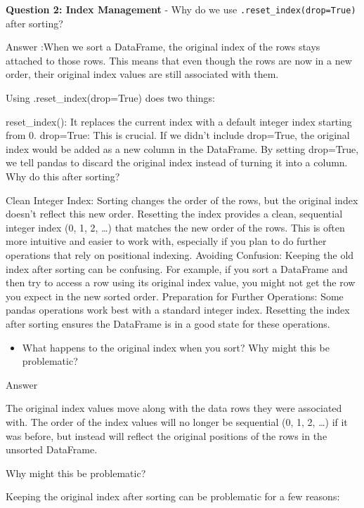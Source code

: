 \documentclass[
  letterpaper,
  DIV=11,
  numbers=noendperiod]{scrartcl}
\providecommand{\tightlist}{%
  \setlength{\itemsep}{0pt}\setlength{\parskip}{0pt}}
\begin{document}
\begin{tcolorbox}
\textbf{Question 2: Index Management} - Why do we use
\texttt{.reset\_index(drop=True)} after sorting?

Answer :When we sort a DataFrame, the original index of the rows stays
attached to those rows. This means that even though the rows are now in
a new order, their original index values are still associated with them.

Using .reset\_index(drop=True) does two things:

reset\_index(): It replaces the current index with a default integer
index starting from 0. drop=True: This is crucial. If we didn't include
drop=True, the original index would be added as a new column in the
DataFrame. By setting drop=True, we tell pandas to discard the original
index instead of turning it into a column. Why do this after sorting?

Clean Integer Index: Sorting changes the order of the rows, but the
original index doesn't reflect this new order. Resetting the index
provides a clean, sequential integer index (0, 1, 2, \ldots) that
matches the new order of the rows. This is often more intuitive and
easier to work with, especially if you plan to do further operations
that rely on positional indexing. Avoiding Confusion: Keeping the old
index after sorting can be confusing. For example, if you sort a
DataFrame and then try to access a row using its original index value,
you might not get the row you expect in the new sorted order.
Preparation for Further Operations: Some pandas operations work best
with a standard integer index. Resetting the index after sorting ensures
the DataFrame is in a good state for these operations.

\begin{itemize}
\tightlist
\item
  What happens to the original index when you sort? Why might this be
  problematic?
\end{itemize}

Answer

The original index values move along with the data rows they were
associated with. The order of the index values will no longer be
sequential (0, 1, 2, \ldots) if it was before, but instead will reflect
the original positions of the rows in the unsorted DataFrame.

Why might this be problematic?

Keeping the original index after sorting can be problematic for a few
reasons:


\end{tcolorbox}
\end{document}
